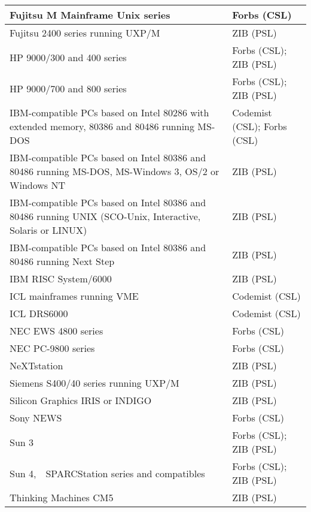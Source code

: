 \begin{center}
\begin{tabular}{|p{2.8in}|p{2.8in}|}
Fujitsu M Mainframe Unix series & Forbs (CSL) \\ \hline

Fujitsu 2400 series running UXP/M & ZIB (PSL) \\ \hline

HP 9000/300 and 400 series & Forbs (CSL); ZIB (PSL) \\ \hline

HP 9000/700 and 800 series & Forbs (CSL); ZIB (PSL) \\ \hline

IBM-compatible PCs based on Intel 80286 with extended memory, 80386 and
80486 running MS-DOS & Codemist (CSL); Forbs (CSL) \\ \hline

IBM-compatible PCs based on Intel 80386 and 80486 running MS-DOS,
MS-Windows 3, OS/2 or Windows NT& ZIB (PSL) \\ \hline

IBM-compatible PCs based on Intel 80386 and 80486 running UNIX
(SCO-Unix, Interactive, Solaris or LINUX) & ZIB (PSL) \\ \hline

IBM-compatible PCs based on Intel 80386 and 80486 running Next Step
& ZIB (PSL) \\ \hline

IBM RISC System/6000 & ZIB (PSL) \\ \hline

ICL mainframes running VME & Codemist (CSL) \\ \hline

ICL DRS6000 & Codemist (CSL) \\ \hline

%
NEC EWS 4800 series & Forbs (CSL) \\ \hline

NEC PC-9800 series & Forbs (CSL) \\ \hline

NeXTstation & ZIB (PSL) \\ \hline

Siemens S400/40 series running UXP/M & ZIB (PSL) \\ \hline

Silicon Graphics IRIS or INDIGO& ZIB (PSL) \\ \hline

Sony NEWS & Forbs (CSL) \\ \hline

Sun 3 & Forbs (CSL); ZIB (PSL) \\ \hline

Sun 4,~~SPARCStation series and compatibles & Forbs (CSL);
ZIB (PSL) \\ \hline

Thinking Machines CM5 & ZIB (PSL) \\ \hline
\end{tabular}
\end{center}
\newpage
